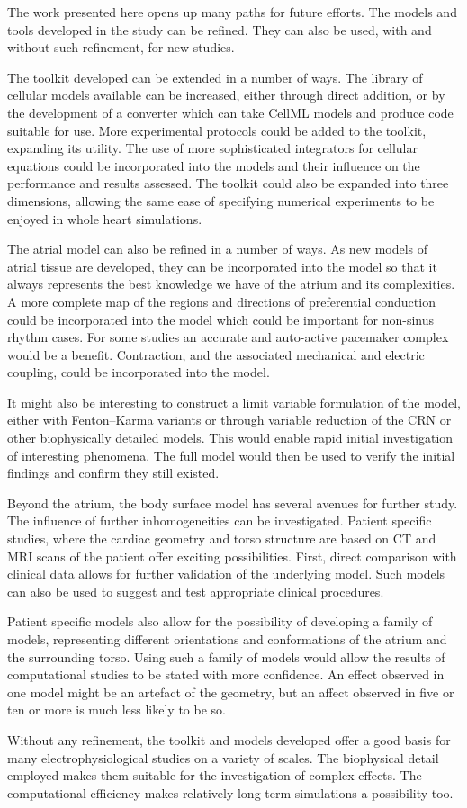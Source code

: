 The work presented here opens up many paths for future efforts.
The models and tools developed in the study can be refined.
They can also be used, with and without such refinement, for new studies.

The toolkit developed can be extended in a number of ways.
The library of cellular models available can be increased, either through
direct addition, or by the development of a converter which can take CellML
models and produce code suitable for use.
More experimental protocols could be added to the toolkit, expanding its
utility.
The use of more sophisticated integrators for cellular equations could be
incorporated into the models and their influence on the performance and results
assessed.
The toolkit could also be expanded into three dimensions, allowing the same ease
of specifying numerical experiments to be enjoyed in whole heart simulations.

The atrial model can also be refined in a number of ways.
As new models of atrial tissue are developed, they can be incorporated into the
model so that it always represents the best knowledge we have of the atrium and
its complexities.
A more complete map of the regions and directions of preferential conduction
could be incorporated into the model which could be important for non-sinus
rhythm cases.
For some studies an accurate and auto-active pacemaker complex would be a
benefit.
Contraction, and the associated mechanical and electric coupling, could be
incorporated into the model.

It might also be interesting to construct a limit variable formulation of the
model, either with Fenton--Karma variants or through variable reduction of the
CRN or other biophysically detailed models.
This would enable rapid initial investigation of interesting phenomena.
The full model would then be used to verify the initial findings and confirm
they still existed.

Beyond the atrium, the body surface model has several avenues for further study.
The influence of further inhomogeneities can be investigated.
Patient specific studies, where the cardiac geometry and torso structure are
based on CT and MRI scans of the patient offer exciting possibilities.
First, direct comparison with clinical data allows for further validation of the
underlying model.
Such models can also be used to suggest and test appropriate clinical
procedures.

Patient specific models also allow for the possibility of developing a family of models,
representing different orientations and conformations of the atrium and the
surrounding torso.
Using such a family of models would allow the results of computational studies
to be stated with more confidence.
An effect observed in one model might be an artefact of the geometry, but an
affect observed in five or ten or more is much less likely to be so.

Without any refinement, the toolkit and models developed offer a good basis for
many electrophysiological studies on a variety of scales.
The biophysical detail employed makes them suitable for the investigation of
complex effects.
The computational efficiency makes relatively long term simulations a
possibility too.
